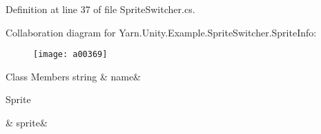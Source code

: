 Definition at line 37 of file Sprite\-Switcher.\-cs.



Collaboration diagram for Yarn.\-Unity.\-Example.\-Sprite\-Switcher.\-Sprite\-Info\-:
\nopagebreak
\begin{figure}[H]
\begin{center}
\leavevmode
\texttt{[image: a00369]}
\end{center}
\end{figure}
\begin{DoxyFields}{Class Members}
\hypertarget{a00153_a3f5bca2fff413dfe075c1fcf7e58369c}{string}\label{a00153_a3f5bca2fff413dfe075c1fcf7e58369c}
&
name&
\\
\hline

\hypertarget{a00153_adc58df011dc2841837b6cf775b372061}{Sprite}\label{a00153_adc58df011dc2841837b6cf775b372061}
&
sprite&
\\
\hline

\end{DoxyFields}
